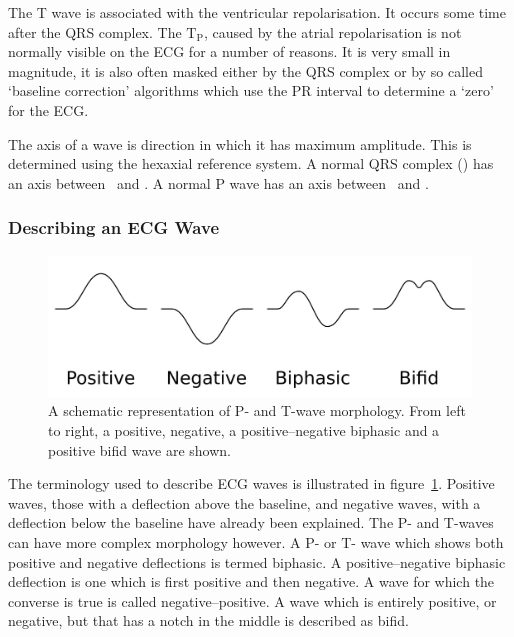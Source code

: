 The T wave is associated with the ventricular repolarisation.
It occurs some time after the QRS complex.
The $\text{T}_{\text{P}}$, caused by the atrial repolarisation is not normally
visible on the ECG for a number of reasons.
It is very small in magnitude, it is also often masked either by the QRS complex
or by so called `baseline correction' algorithms which use the PR interval to
determine a `zero' for the ECG.

The axis of a wave is direction in which it has maximum amplitude.
This is determined using the hexaxial reference system.
A normal QRS complex (\cite{Lipman1994,Katz2006}) has an axis between \
and .
A normal P wave has an axis between \ and .

\subsubsection{Describing an ECG Wave}

\begin{figure}
\begin{center}
\includegraphics{figures/intro/ecg_waveforms}
\end{center}
\caption[ECG Morphology]{
\label{fig:intro:ecg:waveforms}
A schematic representation of P- and T-wave morphology.
From left to right, a positive, negative, a positive--negative biphasic and a
positive bifid wave are shown.
}
\end{figure}

The terminology used to describe ECG waves is illustrated in
figure~\ref{fig:intro:ecg:waveforms}.
Positive waves, those with a deflection above the baseline, and negative waves,
with a deflection below the baseline have already been explained.
The P- and T-waves can have more complex morphology however.
A P- or T- wave which shows both positive and negative deflections is termed
biphasic.
A positive--negative biphasic deflection is one which is first positive and then
negative.
A wave for which the converse is true is called negative--positive.
A wave which is entirely positive, or negative, but that has a notch in the
middle is described as bifid.

